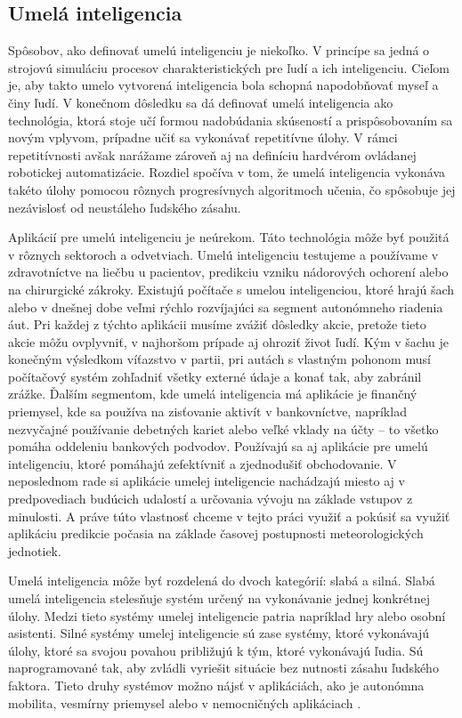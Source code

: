 \subsection{Umelá inteligencia}
Spôsobov, ako definovať umelú inteligenciu je niekoľko. V princípe sa jedná o strojovú simuláciu procesov charakteristických pre ľudí a ich inteligenciu. Cieľom je, aby takto umelo vytvorená inteligencia bola schopná napodobňovať myseľ a činy ľudí. V konečnom dôsledku sa dá definovať umelá inteligencia ako technológia, ktorá stoje učí formou nadobúdania skúseností a prispôsobovaním sa novým vplyvom, prípadne učiť sa vykonávať repetitívne úlohy. V rámci repetitívnosti avšak narážame zároveň aj na definíciu hardvérom ovládanej robotickej automatizácie. Rozdiel spočíva v tom, že umelá inteligencia vykonáva takéto úlohy pomocou rôznych progresívnych algoritmoch učenia, čo spôsobuje jej nezávislosť od neustáleho ľudského zásahu.

Aplikácií pre umelú inteligenciu je neúrekom. Táto technológia môže byť použitá v rôznych sektoroch a odvetviach. Umelú inteligenciu testujeme a používame v zdravotníctve na liečbu u pacientov, predikciu vzniku nádorových ochorení alebo na chirurgické zákroky. Existujú počítače s umelou inteligenciou, ktoré hrajú šach alebo v dnešnej dobe veľmi rýchlo rozvíjajúci sa segment autonómneho riadenia áut. Pri každej z týchto aplikácii musíme zvážiť dôsledky akcie, pretože tieto akcie môžu ovplyvniť, v najhoršom prípade aj ohroziť život ľudí. Kým v šachu je konečným výsledkom víťazstvo v partii, pri autách s vlastným pohonom musí počítačový systém zohľadniť všetky externé údaje a konať tak, aby zabránil zrážke. Ďalším segmentom, kde umelá inteligencia má aplikácie je finančný priemysel, kde sa používa na zisťovanie aktivít v bankovníctve, napríklad nezvyčajné používanie debetných kariet alebo veľké vklady na účty – to všetko pomáha oddeleniu bankových podvodov. Používajú sa aj aplikácie pre umelú inteligenciu, ktoré pomáhajú zefektívniť a zjednodušiť obchodovanie. V neposlednom rade si aplikácie umelej inteligencie nachádzajú miesto aj v predpovediach budúcich udalostí a určovania vývoju na základe vstupov z minulosti. A práve túto vlastnosť chceme v tejto práci využiť a pokúsiť sa využiť aplikáciu predikcie počasia na základe časovej postupnosti meteorologických jednotiek.

Umelá inteligencia môže byť rozdelená do dvoch kategórií: slabá a silná. Slabá umelá inteligencia stelesňuje systém určený na vykonávanie jednej konkrétnej úlohy. Medzi tieto systémy umelej inteligencie patria napríklad hry alebo osobní asistenti. Silné systémy umelej inteligencie sú zase systémy, ktoré vykonávajú úlohy, ktoré sa svojou povahou približujú k tým, ktoré vykonávajú ľudia. Sú naprogramované tak, aby zvládli vyriešit situácie bez nutnosti zásahu ľudského faktora. Tieto druhy systémov možno nájsť v aplikáciách, ako je autonómna mobilita, vesmírny priemysel alebo v nemocničných aplikáciach \cite{ai1}.

